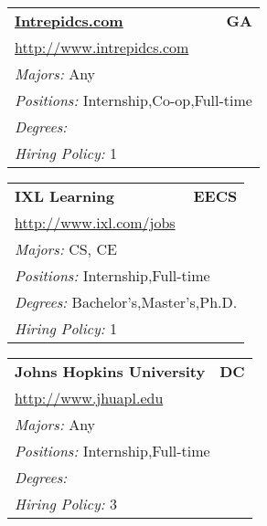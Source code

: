 \documentclass[twoside]{article}
\begin{document}
\begin{center}
\begin{multicols}{3}
\begin{FlushLeft}
\begin{minipage}{.9\columnwidth}
\end{minipage}
 
\begin{minipage}{.9\columnwidth}\begin{tabularx}{.95\columnwidth}{Xr}
                 {\Large\bf \url{Intrepidcs.com}} & {\Large\bf GA}\\
    \multicolumn{2}{p{.95\columnwidth}}{\url{http://www.intrepidcs.com}}\\
    \multicolumn{2}{p{.95\columnwidth}}{\emph{Majors:} Any}\\
    \multicolumn{2}{p{.95\columnwidth}}{\emph{Positions:} Internship,Co-op,Full-time}\\
    \multicolumn{2}{p{.95\columnwidth}}{\emph{Degrees:} }\\
    \multicolumn{2}{p{.95\columnwidth}}{\emph{Hiring Policy:} 1}\\
    \end{tabularx}
    
\end{minipage}
 
\begin{minipage}{.9\columnwidth}\begin{tabularx}{.95\columnwidth}{Xr}
                 {\Large\bf IXL Learning} & {\Large\bf EECS}\\
    \multicolumn{2}{p{.95\columnwidth}}{\url{http://www.ixl.com/jobs}}\\
    \multicolumn{2}{p{.95\columnwidth}}{\emph{Majors:} CS, CE}\\
    \multicolumn{2}{p{.95\columnwidth}}{\emph{Positions:} Internship,Full-time}\\
    \multicolumn{2}{p{.95\columnwidth}}{\emph{Degrees:} Bachelor's,Master's,Ph.D.}\\
    \multicolumn{2}{p{.95\columnwidth}}{\emph{Hiring Policy:} 1}\\
    \end{tabularx}
    
\end{minipage}
 
\begin{minipage}{.9\columnwidth}\begin{tabularx}{.95\columnwidth}{Xr}
                 {\Large\bf Johns Hopkins University} & {\Large\bf DC}\\
    \multicolumn{2}{p{.95\columnwidth}}{\url{http://www.jhuapl.edu}}\\
    \multicolumn{2}{p{.95\columnwidth}}{\emph{Majors:} Any}\\
    \multicolumn{2}{p{.95\columnwidth}}{\emph{Positions:} Internship,Full-time}\\
    \multicolumn{2}{p{.95\columnwidth}}{\emph{Degrees:} }\\
    \multicolumn{2}{p{.95\columnwidth}}{\emph{Hiring Policy:} 3}\\
    \end{tabularx}
    

\end{minipage}
\end{FlushLeft}
\end{multicols}
\end{center}
\end{document}

